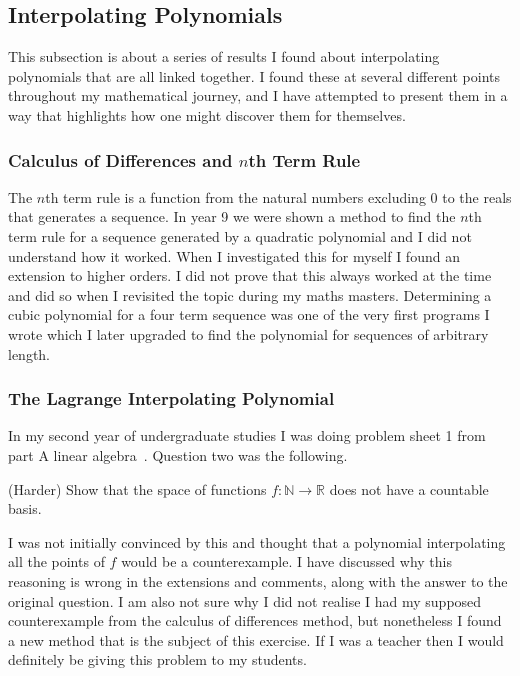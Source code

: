 \subsection{Interpolating Polynomials}

This subsection is about a series of results I found about interpolating polynomials that are all linked together. I found these at several different points throughout my mathematical journey, and I have attempted to present them in a way that highlights how one might discover them for themselves.

\subsubsection{Calculus of Differences and $n$th Term Rule}

The $n$th term rule is a function from the natural numbers excluding 0 to the reals that generates a sequence. In year 9 we were shown a method to find the $n$th term rule for a sequence generated by a quadratic polynomial and I did not understand how it worked. When I investigated this for myself I found an extension to higher orders. I did not prove that this always worked at the time and did so when I revisited the topic during my maths masters. Determining a cubic polynomial for a four term sequence was one of the very first programs I wrote which I later upgraded to find the polynomial for sequences of arbitrary length.



\subsubsection{The Lagrange Interpolating Polynomial}

In my second year of undergraduate studies I was doing problem sheet 1 from part A linear algebra~\cite{PartALinearAlgebraSheet1}. Question two was the following.

\begin{center}
    (Harder) Show that the space of functions $f : \mathbb{N} \to \mathbb{R}$ does not have a countable basis.
\end{center}

I was not initially convinced by this and thought that a polynomial interpolating all the points of $f$ would be a counterexample. I have discussed why this reasoning is wrong in the extensions and comments, along with the answer to the original question. I am also not sure why I did not realise I had my supposed counterexample from the calculus of differences method, but nonetheless I found a new method that is the subject of this exercise. If I was a teacher then I would definitely be giving this problem to my students.

